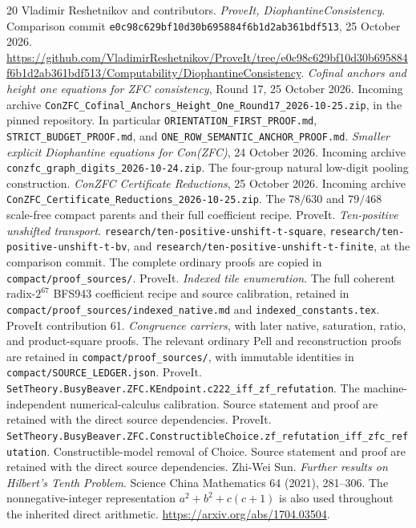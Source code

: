 \documentclass[11pt]{article}
\newcommand{\code}[1]{\nolinkurl{#1}}
\theoremstyle{remark}
\numberwithin{equation}{section}
\begin{document}
\begin{thebibliography}{20}
 Vladimir Reshetnikov and contributors. \emph{ProveIt, DiophantineConsistency}. Comparison commit \code{e0c98c629bf10d30b695884f6b1d2ab361bdf513}, 25 October 2026. \url{https://github.com/VladimirReshetnikov/ProveIt/tree/e0c98c629bf10d30b695884f6b1d2ab361bdf513/Computability/DiophantineConsistency}.
 \emph{Cofinal anchors and height one equations for ZFC consistency}, Round 17, 25 October 2026. Incoming archive \code{ConZFC_Cofinal_Anchors_Height_One_Round17_2026-10-25.zip}, in the pinned repository. In particular \code{ORIENTATION_FIRST_PROOF.md}, \code{STRICT_BUDGET_PROOF.md}, and \code{ONE_ROW_SEMANTIC_ANCHOR_PROOF.md}.
 \emph{Smaller explicit Diophantine equations for Con(ZFC)}, 24 October 2026. Incoming archive \code{conzfc_graph_digits_2026-10-24.zip}. The four-group natural low-digit pooling construction.
 \emph{ConZFC Certificate Reductions}, 25 October 2026. Incoming archive \code{ConZFC_Certificate_Reductions_2026-10-25.zip}. The $78/630$ and $79/468$ scale-free compact parents and their full coefficient recipe.
 ProveIt. \emph{Ten-positive unshifted transport}. \code{research/ten-positive-unshift-t-square}, \code{research/ten-positive-unshift-t-bv}, and \code{research/ten-positive-unshift-t-finite}, at the comparison commit. The complete ordinary proofs are copied in \code{compact/proof_sources/}.
 ProveIt. \emph{Indexed tile enumeration}. The full coherent radix-$2^{67}$ BFS943 coefficient recipe and source calibration, retained in \code{compact/proof_sources/indexed_native.md} and \code{indexed_constants.tex}.
 ProveIt contribution 61. \emph{Congruence carriers}, with later native, saturation, ratio, and product-square proofs. The relevant ordinary Pell and reconstruction proofs are retained in \code{compact/proof_sources/}, with immutable identities in \code{compact/SOURCE_LEDGER.json}.
 ProveIt. \code{SetTheory.BusyBeaver.ZFC.KEndpoint.c222_iff_zf_refutation}. The machine-independent numerical-calculus calibration. Source statement and proof are retained with the direct source dependencies.
 ProveIt. \code{SetTheory.BusyBeaver.ZFC.ConstructibleChoice.zf_refutation_iff_zfc_refutation}. Constructible-model removal of Choice. Source statement and proof are retained with the direct source dependencies.
 Zhi-Wei Sun. \emph{Further results on Hilbert's Tenth Problem}. Science China Mathematics 64 (2021), 281--306. The nonnegative-integer representation $a^2+b^2+c(c+1)$ is also used throughout the inherited direct arithmetic. \url{https://arxiv.org/abs/1704.03504}.
\end{thebibliography}
\end{document}
